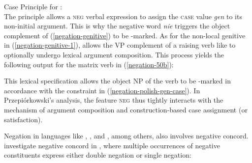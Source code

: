 \documentclass[output=paper
 	        ,biblatex
                ,babelshorthands
                ,newtxmath
                ,draftmode
                ,colorlinks, citecolor=brown
]{langscibook}
\begin{document}
\begin{exe}
\begin{xlist}
\ea
\label{negation-polish-gen-case}
Case Principle for :\\
  \impl
{}
\z
The principle allows a \textsc{neg} verbal expression to assign
 the \textsc{case} value \textit{gen} to its non-initial argument.
%
This is why the negative word \emph{nie} triggers the object complement of
(\ref{negation-genitive}) to be \GEN-marked.
As for the non-local genitive in (\ref{negation-genitive-1}), \citet[]{Prz:00}
allows the VP complement of a raising verb like  to optionally undergo lexical
argument composition. This process yields the following output for the
matrix verb in (\ref{negation-50b}):

\ea
\label{negation-polish-case}
\z
%
This lexical specification allows the object NP of the verb to be
-marked in accordance with the constraint in (\ref{negation-polish-gen-case}).
In Przepiórkowski's analysis, the feature
\textsc{neg} thus tightly interacts with the mechanism of argument composition and construction-based case assignment (or satisfaction).

Negation in languages like , , and , among others, also involves negative concord.
 investigate  negative concord in , where multiple occurrences
of negative constituents express either
double negation or single negation:


\end{xlist}
\end{exe}
\end{document}
